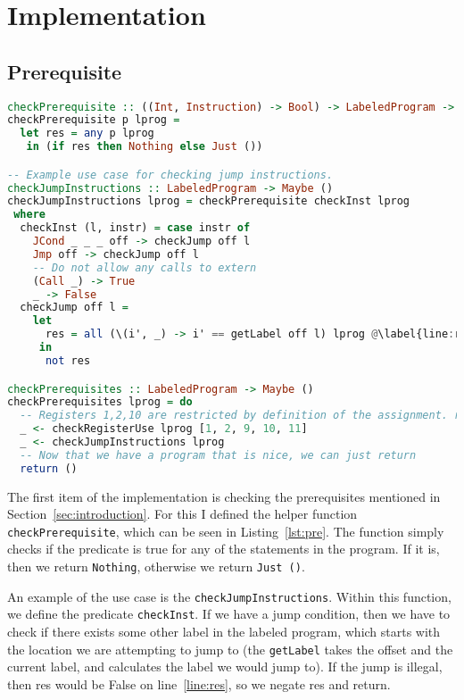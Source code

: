 \section{Implementation}
\subsection{Prerequisite}
\begin{lstlisting}[language={haskell}, caption={Cheking prerequisites}, label={lst:pre}, escapechar=@]
checkPrerequisite :: ((Int, Instruction) -> Bool) -> LabeledProgram -> Maybe ()
checkPrerequisite p lprog =
  let res = any p lprog
   in (if res then Nothing else Just ())

-- Example use case for checking jump instructions.
checkJumpInstructions :: LabeledProgram -> Maybe ()
checkJumpInstructions lprog = checkPrerequisite checkInst lprog
 where
  checkInst (l, instr) = case instr of
    JCond _ _ _ off -> checkJump off l
    Jmp off -> checkJump off l
    -- Do not allow any calls to extern
    (Call _) -> True
    _ -> False
  checkJump off l =
    let
      res = all (\(i', _) -> i' == getLabel off l) lprog @\label{line:res}@
     in
      not res

checkPrerequisites :: LabeledProgram -> Maybe ()
checkPrerequisites lprog = do
  -- Registers 1,2,10 are restricted by definition of the assignment. register 9, 11 is used for guards
  _ <- checkRegisterUse lprog [1, 2, 9, 10, 11]
  _ <- checkJumpInstructions lprog
  -- Now that we have a program that is nice, we can just return
  return ()
\end{lstlisting}

The first item of the implementation is checking the prerequisites mentioned in
Section~\ref{sec:introduction}. For this I defined the helper function
\texttt{checkPrerequisite}, which can be seen in Listing~\ref{lst:pre}. The
function simply checks if the predicate is true for any of the statements in
the program. If it is, then we return \texttt{Nothing}, otherwise we return \texttt{Just ()}.

An example of the use case is the \texttt{checkJumpInstructions}. Within this
function, we define the predicate \texttt{checkInst}. If we have a jump
condition, then we have to check if there exists some other label in the
labeled program, which starts with the location we are attempting to jump to
(the \texttt{getLabel} takes the offset and the current label, and calculates
the label we would jump to). If the jump is illegal, then res would be False on
line~\ref{line:res}, so we negate res and return.

